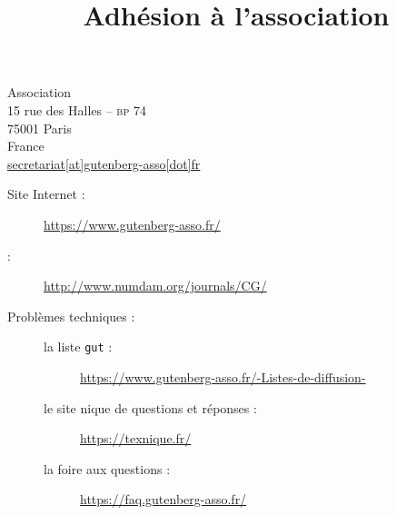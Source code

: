 
\enlargethispage{1.5cm}
\scriptsize
\vspace*{-1cm}
\hspace*{-1.5cm}%
\ExplSyntaxOn
{}%
\ExplSyntaxOff
\hfill%
\begin{minipage}[t]{.5\textwidth}%
  \footnotesize\raggedleft%
  Association \gut{}\\
  15 rue des Halles -- \textsc{bp} 74\\
  75001 Paris\\
  France\\
  \url{secretariat[at]gutenberg-asso[dot]fr}
\end{minipage}%

\begin{description}
\item[Site Internet :] \url{https://www.gutenberg-asso.fr/}
\item[\Cahiers{} :] \url{http://www.numdam.org/journals/CG/}
\item[Problèmes techniques :]
  \leavevmode
  \begin{description}
  \item[la liste \texttt{gut} :]
    \url{https://www.gutenberg-asso.fr/-Listes-de-diffusion-}
  \item[le site nique de questions et réponses :]
    \url{https://texnique.fr/}
  \item[la foire aux questions :]
    \url{https://faq.gutenberg-asso.fr/}
  \end{description}
\end{description}
%

\title{Adhésion à l'association}
\label{letgut_label_adhesions}

